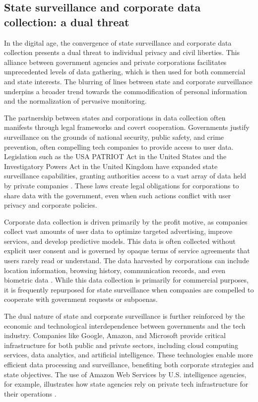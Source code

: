 \subsection{State surveillance and corporate data collection: a dual threat}

In the digital age, the convergence of state surveillance and corporate data collection presents a dual threat to individual privacy and civil liberties. This alliance between government agencies and private corporations facilitates unprecedented levels of data gathering, which is then used for both commercial and state interests. The blurring of lines between state and corporate surveillance underpins a broader trend towards the commodification of personal information and the normalization of pervasive monitoring.

The partnership between states and corporations in data collection often manifests through legal frameworks and covert cooperation. Governments justify surveillance on the grounds of national security, public safety, and crime prevention, often compelling tech companies to provide access to user data. Legislation such as the USA PATRIOT Act in the United States and the Investigatory Powers Act in the United Kingdom have expanded state surveillance capabilities, granting authorities access to a vast array of data held by private companies \cite[pp.~145-148]{greenwald2014no}. These laws create legal obligations for corporations to share data with the government, even when such actions conflict with user privacy and corporate policies.

Corporate data collection is driven primarily by the profit motive, as companies collect vast amounts of user data to optimize targeted advertising, improve services, and develop predictive models. This data is often collected without explicit user consent and is governed by opaque terms of service agreements that users rarely read or understand. The data harvested by corporations can include location information, browsing history, communication records, and even biometric data \cite[pp.~28-30]{zeynep2014engineering}. While this data collection is primarily for commercial purposes, it is frequently repurposed for state surveillance when companies are compelled to cooperate with government requests or subpoenas.

The dual nature of state and corporate surveillance is further reinforced by the economic and technological interdependence between governments and the tech industry. Companies like Google, Amazon, and Microsoft provide critical infrastructure for both public and private sectors, including cloud computing services, data analytics, and artificial intelligence. These technologies enable more efficient data processing and surveillance, benefiting both corporate strategies and state objectives. The use of Amazon Web Services by U.S. intelligence agencies, for example, illustrates how state agencies rely on private tech infrastructure for their operations \cite[pp.~212-215]{schneier2015data}.

